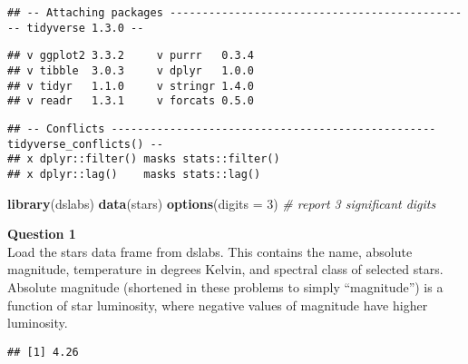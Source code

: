 \documentclass[]{article}
\newenvironment{Shaded}{\begin{snugshade}}{\end{snugshade}}
\newcommand{\CommentTok}[1]{\textcolor[rgb]{0.56,0.35,0.01}{\textit{#1}}}
\newcommand{\DataTypeTok}[1]{\textcolor[rgb]{0.13,0.29,0.53}{#1}}
\newcommand{\DecValTok}[1]{\textcolor[rgb]{0.00,0.00,0.81}{#1}}
\newcommand{\KeywordTok}[1]{\textcolor[rgb]{0.13,0.29,0.53}{\textbf{#1}}}
\newcommand{\NormalTok}[1]{#1}
\newcommand{\OperatorTok}[1]{\textcolor[rgb]{0.81,0.36,0.00}{\textbf{#1}}}
\begin{document}
\begin{verbatim}
## -- Attaching packages ----------------------------------------------- tidyverse 1.3.0 --
\end{verbatim}

\begin{verbatim}
## v ggplot2 3.3.2     v purrr   0.3.4
## v tibble  3.0.3     v dplyr   1.0.0
## v tidyr   1.1.0     v stringr 1.4.0
## v readr   1.3.1     v forcats 0.5.0
\end{verbatim}

\begin{verbatim}
## -- Conflicts -------------------------------------------------- tidyverse_conflicts() --
## x dplyr::filter() masks stats::filter()
## x dplyr::lag()    masks stats::lag()
\end{verbatim}

\begin{Shaded}
\begin{Highlighting}[]
\KeywordTok{library}\NormalTok{(dslabs)}
\KeywordTok{data}\NormalTok{(stars)}
\KeywordTok{options}\NormalTok{(}\DataTypeTok{digits =} \DecValTok{3}\NormalTok{)   }\CommentTok{# report 3 significant digits}
\end{Highlighting}
\end{Shaded}

\textbf{Question 1}\\
Load the stars data frame from dslabs. This contains the name, absolute
magnitude, temperature in degrees Kelvin, and spectral class of selected
stars. Absolute magnitude (shortened in these problems to simply
``magnitude'') is a function of star luminosity, where negative values
of magnitude have higher luminosity.

\begin{Shaded}
\end{Shaded}

\begin{verbatim}
## [1] 4.26
\end{verbatim}

\begin{Shaded}
\end{Shaded}
\end{document}

